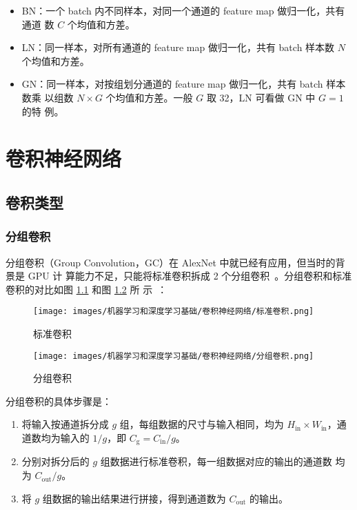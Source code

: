 \begin{itemize}
  \item BN：一个 batch 内不同样本，对同一个通道的 feature map 做归一化，共有通道
    数 $C$ 个均值和方差。
  \item LN：同一样本，对所有通道的 feature map 做归一化，共有 batch 样本数 $N$
    个均值和方差。
  \item GN：同一样本，对按组划分通道的 feature map 做归一化，共有 batch 样本数乘
    以组数 $N \times G$ 个均值和方差。一般 $G$ 取 32，LN 可看做 GN 中 $G=1$ 的特
    例。
\end{itemize}

\chapter{卷积神经网络}

\section{卷积类型}

\subsection{分组卷积}

分组卷积（Group Convolution，GC）在 AlexNet 中就已经有应用，但当时的背景是 GPU 计
算能力不足，只能将标准卷积拆成 2 个分组卷积~。分组卷积和标准
卷积的对比如图 \ref{fig:normal-conv} 和图 \ref{fig:group-conv} 所
示~：

\begin{figure}[ht]
  \centering
  \texttt{[image: images/机器学习和深度学习基础/卷积神经网络/标准卷积.png]}
  \caption{标准卷积}
  \label{fig:normal-conv}
\end{figure}

\begin{figure}[ht]
  \centering
  \texttt{[image: images/机器学习和深度学习基础/卷积神经网络/分组卷积.png]}
  \caption{分组卷积}
  \label{fig:group-conv}
\end{figure}

分组卷积的具体步骤是：

\begin{enumerate}
  \item 将输入按通道拆分成 $g$ 组，每组数据的尺寸与输入相同，均为 $H_{\mathrm{in}}
    \times W_{\mathrm{in}}$，通道数均为输入的 $ 1/g $，即 $
    C_{\mathrm{g}} = C_{\mathrm{in}} / g $。
  \item 分别对拆分后的 $g$ 组数据进行标准卷积，每一组数据对应的输出的通道数
    均为 $ C_{\mathrm{out}}/g $。
  \item 将 $g$ 组数据的输出结果进行拼接，得到通道数为 $C_{\mathrm{out}}$
    的输出。
\end{enumerate}

